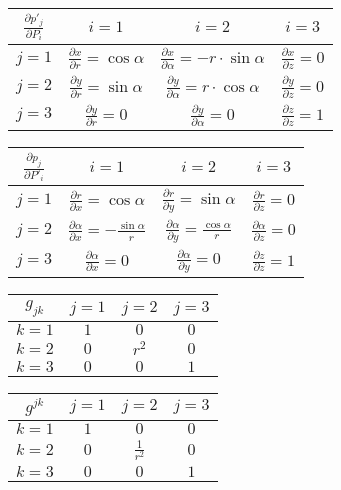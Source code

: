 \begin{tabular}{| c || c | c | c |}
\hline
\(\frac{\partial p'_j}{\partial P_i}\) & \(i=1\) & \(i=2\) & \(i=3\) \\
\hline
\hline
\(j=1\) & \(\frac{\partial x}{\partial r} = \cos \alpha\) & \(\frac{\partial x}{\partial \alpha} = -r \cdot \sin \alpha\) & \(\frac{\partial x}{\partial z} = 0\) \\
\hline
\(j=2\) & \(\frac{\partial y}{\partial r} = \sin \alpha\) & \(\frac{\partial y}{\partial \alpha} = r \cdot \cos \alpha\) & \(\frac{\partial y}{\partial z} = 0\) \\
\hline
\(j=3\) & \(\frac{\partial y}{\partial r} = 0\) & \(\frac{\partial y}{\partial \alpha} = 0\) & \(\frac{\partial z}{\partial z} = 1\) \\
\hline
\end{tabular}

\begin{tabular}{| c || c | c | c |}
\hline
\(\frac{\partial p_j}{\partial P'_i}\) & \(i=1\) & \(i=2\) & \(i=3\)\\
\hline
\hline
\(j=1\) & \(\frac{\partial r}{\partial x} = \cos \alpha\) & \(\frac{\partial r}{\partial y} = \sin \alpha\) & \(\frac{\partial r}{\partial z} = 0\)\\
\hline
\(j=2\) & \(\frac{\partial \alpha}{\partial x} = -\frac{\sin \alpha}{r}\) & \(\frac{\partial \alpha}{\partial y} = \frac{\cos \alpha}{r}\) & \(\frac{\partial \alpha}{\partial z} = 0\)\\
\hline
\(j=3\) & \(\frac{\partial \alpha}{\partial x} = 0\) & \(\frac{\partial \alpha}{\partial y} = 0\) & \(\frac{\partial z}{\partial z} = 1\)\\
\hline
\end{tabular}

\begin{tabular}{| c || c | c | c |}
\hline
\(g_{jk}\) & \(j=1\) & \(j=2\) & \(j=3\) \\
\hline
\hline
\(k=1\) & \(1\) & \(0\) & \(0\) \\
\hline
\(k=2\) & \(0\) & \(r^2\) & \(0\) \\
\hline
\(k=3\) & \(0\) & \(0\) & \(1\) \\
\hline
\end{tabular}

\begin{tabular}{| c || c | c | c |}
\hline
\(g^{jk}\) & \(j=1\) & \(j=2\) & \(j=3\) \\
\hline
\hline
\(k=1\) & \(1\) & \(0\) & \(0\) \\
\hline
\(k=2\) & \(0\) & \(\frac{1}{r^2}\) & \(0\) \\
\hline
\(k=3\) & \(0\) & \(0\) & \(1\) \\
\hline
\end{tabular}


